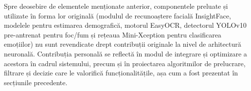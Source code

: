\documentclass[../../main.tex]{subfiles}
\begin{document}
Spre deosebire de elementele menționate anterior, componentele preluate și utilizate în forma lor originală (modulul de recunoaștere facială \linebreak InsightFace, modelele pentru estimarea demografică, motorul EasyOCR, detectorul YOLOv10 pre-antrenat pentru foc/fum și rețeaua Mini-Xception pentru clasificarea emoțiilor) nu sunt revendicate drept contribuții originale la nivel de arhitectură neuronală. Contribuția personală se reflectă în modul de integrare și optimizare a acestora în cadrul sistemului, precum și în proiectarea algoritmilor de prelucrare, filtrare și decizie care le valorifică funcționalitățile, așa cum a fost prezentat în secțiunile precedente.
\end{document}
